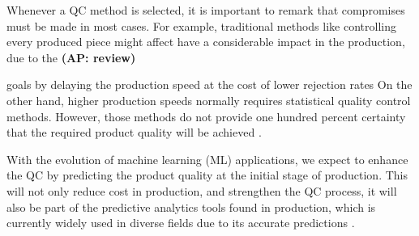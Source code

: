 \documentclass[5p,times,procedia]{elsarticle}
\newcommand{\AP}[1]{{\color{blue} {\bf (AP: #1)}}}
\begin{document}
Whenever a QC method is selected, it is important to remark that compromises must be made in most cases. For example, traditional methods like controlling every produced piece might affect have a considerable impact in the production, due to the \AP{review}

goals by delaying the production speed at the cost of lower rejection rates On the other hand, higher production speeds normally requires statistical quality control methods. However, those methods do not provide one hundred percent certainty that the required product quality will be achieved \cite{selvamuthu2018introduction, kurniati2015quality}.

With the evolution of machine learning (ML) applications, we expect to enhance the QC by predicting the product quality at the initial stage of production. This will not only reduce cost in production, and strengthen the QC process, it will also be part of the predictive analytics tools found in production, which is currently widely used in diverse fields due to its accurate predictions \cite{bishop2006pattern, krauss2019machine}.

\end{document}
